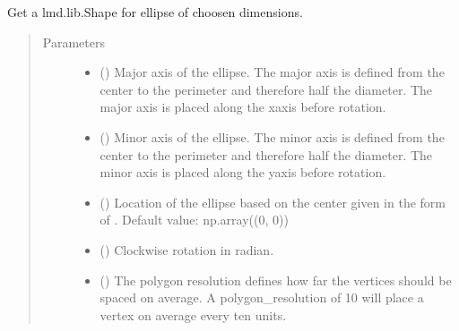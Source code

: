 \documentclass[letterpaper,10pt,english,openany,oneside]{sphinxmanual}
\begin{document}
\begin{fulllineitems}
\label{\detokenize{pages/modules:lmd.tools.ellipse}}
\sphinxAtStartPar
Get a lmd.lib.Shape for ellipse of choosen dimensions.
\begin{quote}\begin{description}
\item[{Parameters}] \leavevmode\begin{itemize}
\item {} 
\sphinxAtStartPar
{} () \textendash{} Major axis of the ellipse. The major axis is defined from the center to the perimeter and therefore half the diameter. The major axis is placed along the x\sphinxhyphen{}axis before rotation.

\item {} 
\sphinxAtStartPar
{} () \textendash{} Minor axis of the ellipse. The minor axis is defined from the center to the perimeter and therefore half the diameter. The minor axis is placed along the y\sphinxhyphen{}axis before rotation.

\item {} 
\sphinxAtStartPar
{} () \textendash{} Location of the ellipse based on the center given in the form of . Default value: np.array((0, 0))

\item {} 
\sphinxAtStartPar
{} () \textendash{} Clockwise rotation in radian.

\item {} 
\sphinxAtStartPar
{} () \textendash{} The polygon resolution defines how far the vertices should be spaced on average. A polygon\_resolution of 10 will place a vertex on average every ten units.


\end{itemize}
\end{description}
\end{quote}
\end{fulllineitems}
\end{document}

